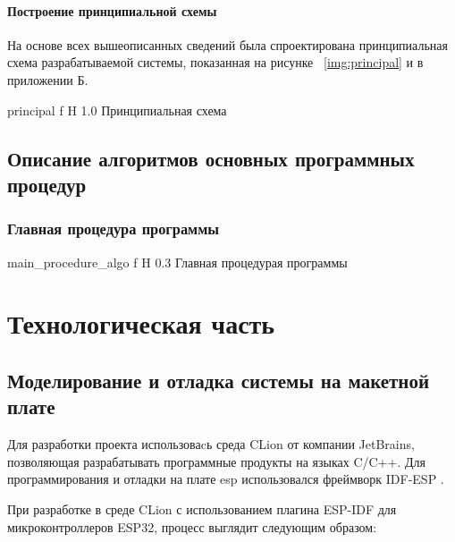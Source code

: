 \documentclass{bmstu}
\begin{document}
    \subsubsection{Построение принципиальной схемы}

    На основе всех вышеописанных сведений была спроектирована принципиальная схема разрабатываемой системы,
    показанная на рисунке ~\ref{img:principal} и в приложении Б.

        {principal} %
        {f} %
        {H} %
        {1.0\textwidth} %
        {Принципиальная схема} %

    \section{Описание алгоритмов основных программных процедур}

    \subsection{Главная процедура программы}

        {main_procedure_algo} %
        {f} %
        {H} %
        {0.3\textwidth} %
        {Главная процедурая программы} %

    \chapter{Технологическая часть}

    \section{Моделирование и отладка системы на макетной плате}

    Для разработки проекта использоваcь среда CLion \cite{ESPIDFCLion} от компании JetBrains, позволяющая разрабатывать программные продукты на языках C/C++.
    Для программирования и отладки на плате esp использовался фреймворк IDF-ESP \cite{GetStartedESP32}.

    При разработке в среде CLion с использованием плагина ESP-IDF для микроконтроллеров ESP32, процесс выглядит следующим образом:
\end{document}
